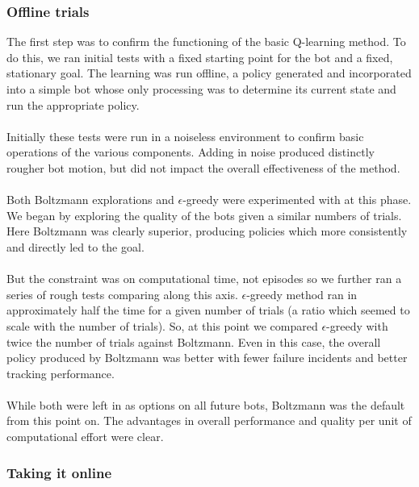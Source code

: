 \documentclass{aiaa-tc}%
\begin{document}
\subsubsection{Offline trials}
The first step was to confirm the functioning of the basic
Q-learning method. To do this, we ran initial tests with a fixed
starting point for the bot and a fixed, stationary
goal. The learning was run offline, a policy generated and
incorporated into a simple bot whose only processing was to determine
its current state and run the appropriate policy. \\ \\
Initially these tests were run in a noiseless environment to
confirm basic operations of the various components. Adding in noise
produced distinctly rougher bot motion, but did not impact the overall
effectiveness of the method. \\ \\
Both Boltzmann explorations and $\epsilon$-greedy were experimented
with at this phase.  We began by exploring the quality of the bots
given a similar numbers of trials. Here Boltzmann was clearly
superior, producing policies which more consistently and directly led
to the goal. \\ \\
But the constraint was on computational time, not episodes so we
further ran a series of rough tests comparing along this axis. $\epsilon$-greedy method ran in approximately half the
time for a given number of trials (a ratio which seemed to scale with
the number of trials). So, at this point we compared $\epsilon$-greedy
with twice the number of trials against Boltzmann. Even in this case,
the overall policy produced by Boltzmann was better with fewer failure
incidents and better tracking performance. \\ \\
While both were left in as options on all future
bots, Boltzmann was the default from this point on. The advantages in
overall performance and quality per unit of computational effort were
clear.
\subsubsection{Taking it online}
\end{document}
